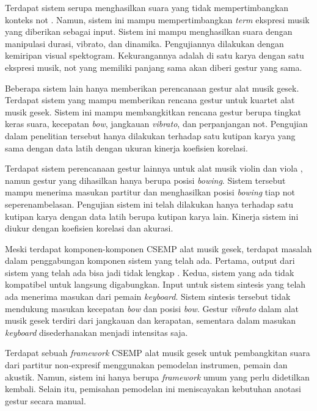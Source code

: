 Terdapat sistem serupa menghasilkan suara yang tidak mempertimbangkan konteks not \parencite{yang2016synthesis}. Namun, sistem ini mampu mempertimbangkan \textit{term} ekspresi musik yang diberikan sebagai input. Sistem ini mampu menghasilkan suara dengan manipulasi durasi, vibrato, dan dinamika. Pengujiannya dilakukan dengan kemiripan visual spektogram. Kekurangannya adalah di satu karya dengan satu ekspresi musik, not yang memiliki panjang sama akan diberi gestur yang sama.

Beberapa sistem lain hanya memberikan perencanaan gestur alat musik gesek. Terdapat sistem yang mampu memberikan rencana gestur untuk kuartet alat musik gesek. \parencite{marchini2014quartet} Sistem ini mampu membangkitkan rencana gestur berupa tingkat keras suara, kecepatan \textit{bow}, jangkauan \textit{vibrato}, dan perpanjangan not. Pengujian dalam penelitian tersebut hanya dilakukan terhadap satu kutipan karya yang sama dengan data latih dengan ukuran kinerja koefisien korelasi.

Terdapat sistem perencanaan gestur lainnya untuk alat musik violin dan viola \parencite{yu2017bowing}, namun gestur yang dihasilkan hanya berupa posisi \textit{bowing}. Sistem tersebut mampu menerima masukan partitur dan menghasilkan posisi \textit{bowing} tiap not seperenambelasan. Pengujian sistem ini telah dilakukan hanya terhadap satu kutipan karya dengan data latih berupa kutipan karya lain. Kinerja sistem ini diukur dengan koefisien korelasi dan akurasi.

Meski terdapat komponen-komponen CSEMP alat musik gesek, terdapat masalah dalam penggabungan komponen sistem yang telah ada. Pertama, output dari sistem yang telah ada bisa jadi tidak lengkap \parencite{yu2017bowing}. Kedua, sistem yang ada tidak kompatibel untuk langsung digabungkan. Input untuk sistem sintesis yang telah ada \parencite{lindemann2007rpm} menerima masukan dari pemain \textit{keyboard}. Sistem sintesis tersebut tidak mendukung masukan kecepatan \textit{bow} \parencite{marchini2014quartet}\parencite{yu2017bowing} dan posisi \textit{bow}\parencite{yu2017bowing}. Gestur \textit{vibrato} dalam alat musik gesek terdiri dari jangkauan dan kerapatan, sementara dalam masukan \textit{keyboard} disederhanakan menjadi intensitas saja.

Terdapat sebuah \textit{framework} CSEMP alat musik gesek untuk pembangkitan suara dari partitur non-expresif \parencite{perez2015} menggunakan pemodelan instrumen, pemain dan akustik. Namun, sistem ini hanya berupa \textit{framework} umum yang perlu didetilkan kembali. Selain itu, pemisahan pemodelan ini meniscayakan kebutuhan anotasi gestur secara manual.

